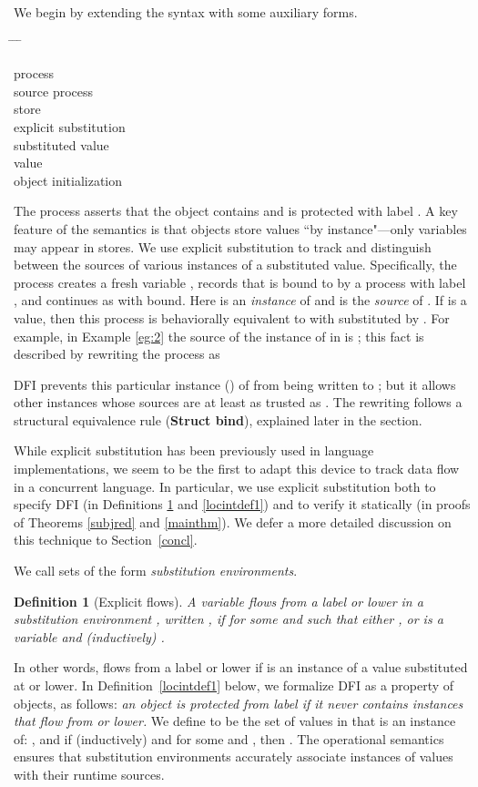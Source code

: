 \documentclass{sigplanconf}
\newenvironment{defn}{\begin{tabbing}
  \hspace{1.5em} \= \hspace{.20\linewidth - 1.5em} \= \hspace{1.5em} \= \kill
  }{
  \end{tabbing}}
\newcommand{\entry}[2]{\>\>\>#2}
\newcommand{\clause}[2]{\>\>#2}
\newcommand{\mycategory}[2]{\clause{#1::=}{#2}}
\newcommand{\labp}{\mathsf P}
\newcommand{\labo}{\mathsf O}
\newcommand{\labb}{\mathsf S}
\newcommand{\new}[2]{(\nu #1)\:#2}
\newcommand{\store}[1]{\stackrel{#1}\mapsto}
\newcommand{\srule}[1]{\textbf{Struct #1}}
\newtheorem{definition}{Definition}[section]
\begin{document}
We begin by extending the syntax with some auxiliary forms.
\begin{defn}
\mycategory{a,b}{process} \\
\entry{\cdots}{source process}\\
\entry{\omega \store{\labo} x}{store} \\
\entry{\new {x/\mu@{\labp}} a}{explicit substitution}  \\
\mycategory{\mu}{substituted value} \\
\entry{u}{value}\\
\entry{\mathsf{new}(x\mbox{ \# }\labb)}{object initialization}
\end{defn} 
The process  asserts that the object  contains  and is protected with label . A key feature of the semantics is that objects store values ``by instance"---only variables may appear in stores. 
We use explicit substitution to track and distinguish
between the sources of various instances of a substituted value. 
Specifically, the process  creates a fresh variable , records that  is bound to  by a
process with label , and continues as  with  bound. Here  is an \emph{instance} of  and  is the \emph{source} of . If  is a value, then this process is behaviorally equivalent to  with  substituted by . For example, in Example \ref{eg:2} the source of the instance of  in  is ; this fact is described by rewriting the process  as 

DFI prevents this particular instance () of  from being written to ; but it allows other instances whose sources are at least as trusted as . The rewriting follows a structural equivalence rule (\srule{bind}), explained later in the section.

While explicit substitution has been previously used in language implementations, we seem to be the first to adapt this device to track data flow in a concurrent language. In particular, we use explicit substitution both to specify DFI (in Definitions \ref{flowsdef} and \ref{locintdef1}) and to verify it statically (in proofs of Theorems \ref{subjred} and \ref{mainthm}).
We defer a more detailed discussion on this technique to Section~\ref{concl}.


We call sets of the form 
\emph{substitution environments}. \begin{definition}[Explicit flows]\label{flowsdef} A variable  flows from a label  or lower in a substitution environment , written , if  for some  and  such that either , or  is a variable and (inductively) .
\end{definition}
In other words,  flows from a label  or lower if  is an instance of a value substituted at  or lower. 
In Definition~\ref{locintdef1} below, we formalize DFI as a property of objects, as follows: \emph{an object is protected from label  if it never contains instances that flow from  or lower.} 
We define  to be the set of values in  that  is an instance of: , and if (inductively)  and  for some  and , then . 
The operational semantics ensures that substitution environments accurately associate instances of values with their runtime sources. 
\end{document}
